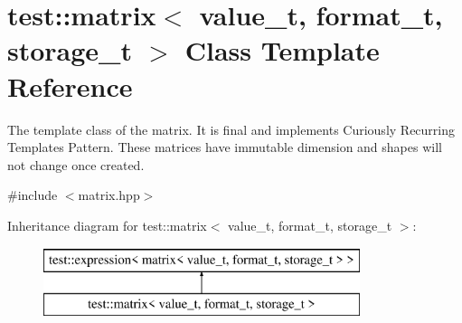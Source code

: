 \hypertarget{classtest_1_1matrix}{}\section{test\+::matrix$<$ value\+\_\+t, format\+\_\+t, storage\+\_\+t $>$ Class Template Reference}
\label{classtest_1_1matrix}


The template class of the matrix. It is final and implements Curiously Recurring Templates Pattern. These matrices have immutable dimension and shapes will not change once created.  




{\ttfamily \#include $<$matrix.\+hpp$>$}

Inheritance diagram for test\+::matrix$<$ value\+\_\+t, format\+\_\+t, storage\+\_\+t $>$\+:\begin{figure}[H]
\begin{center}
\leavevmode
\includegraphics[height=2.000000cm]{classtest_1_1matrix}
\end{center}
\end{figure}
